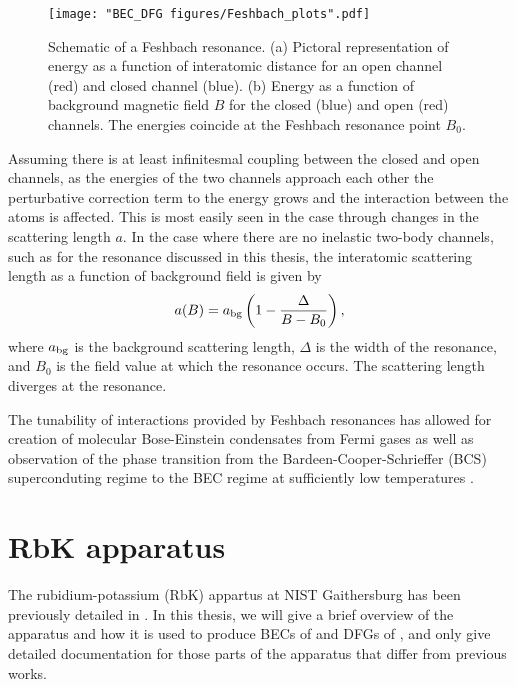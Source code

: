 \begin{figure}
	\texttt{[image: "BEC\_DFG figures/Feshbach\_plots".pdf]}
\caption[Schematic of a Feshbach resonance]{Schematic of a Feshbach resonance. (a) Pictoral representation of energy as a function of interatomic distance for an open channel (red) and closed channel (blue). (b) Energy as a function of background magnetic field $B$ for the closed (blue) and open (red) channels. The energies coincide at the Feshbach resonance point $B_0$. }
\label{fig:FeshbachSchematic}
\end{figure}

Assuming there is at least infinitesmal coupling between the closed and open channels, as the energies of the two channels approach each other the perturbative correction term to the energy grows and the interaction between the atoms is affected. This is most easily seen in the \swave{} case through changes in the scattering length $a$. In the case where there are no inelastic two-body channels, such as for the \K{} resonance discussed in this thesis, the interatomic scattering length as a function of background field is given by\cite{Chin10}
\begin{equation}
a(B)=a_{\rm{bg}}\left(1-\frac{\Delta}{B-B_0}\right),
\label{eqn:feshbach}
\end{equation}
where $a_{\rm{bg}}$ is the background scattering length, $\Delta$ is the width of the resonance, and $B_0$ is the field value at which the resonance occurs. The scattering length diverges at the resonance.

The tunability of interactions provided by Feshbach resonances has allowed for creation of molecular Bose-Einstein condensates from Fermi gases \cite{Greiner03,Zwierlein03, Jochim03} as well as observation of the phase transition from the Bardeen-Cooper-Schrieffer (BCS) superconduting regime to the BEC regime at sufficiently low temperatures \cite{Bartenstein04, Bourdel04, Zwierlein04, Regal04}.

\section{RbK apparatus}\label{sec:RbK}

The rubidium-potassium (RbK) appartus at NIST Gaithersburg has been previously detailed in \cite{Lin2009,KarinaThesis, AycockThesis}. In this thesis, we will give a brief overview of the apparatus and how it is used to produce BECs of \Rb{} and DFGs of \K{}, and only give detailed documentation for those parts of the apparatus that differ from previous works. 

